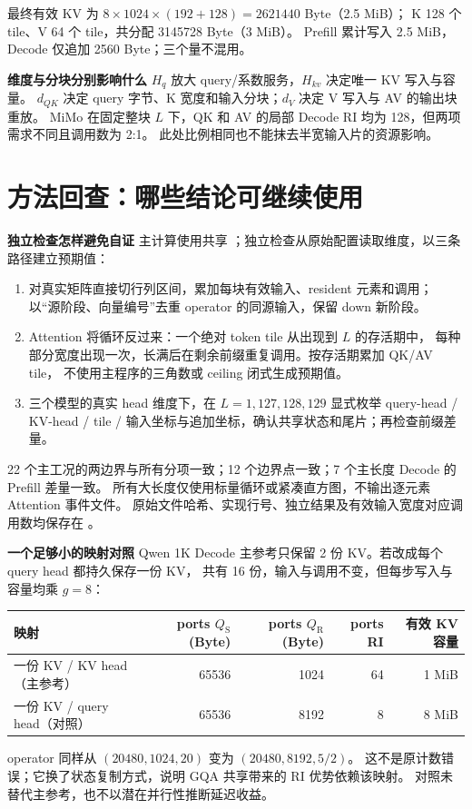 \documentclass[11pt,a4paper,fontset=fandol]{ctexart}
\newcommand{\qs}{Q_{\mathrm S}}
\newcommand{\qr}{Q_{\mathrm R}}
\newcommand{\para}[1]{\par\smallskip\noindent\textbf{#1}\quad}
\begin{document}
最终有效 KV 为 $8\times1024\times(192+128)=2621440$ Byte（2.5 MiB）；
K 128 个 tile、V 64 个 tile，共分配 3145728 Byte（3 MiB）。
Prefill 累计写入 2.5 MiB，Decode 仅追加 2560 Byte；三个量不混用。

\para{维度与分块分别影响什么}
$H_q$ 放大 query/系数服务，$H_{kv}$ 决定唯一 KV 写入与容量。
$d_{QK}$ 决定 query 字节、K 宽度和输入分块；$d_V$ 决定 V 写入与 AV 的输出块重放。
MiMo 在固定整块 $L$ 下，QK 和 AV 的局部 Decode RI 均为 128，但两项需求不同且调用数为 2:1。
此处比例相同也不能抹去半宽输入片的资源影响。

\clearpage
\section{方法回查：哪些结论可继续使用}
\para{独立检查怎样避免自证}
主计算使用共享 ；独立检查从原始配置读取维度，以三条路径建立预期值：
\begin{enumerate}
\item 对真实矩阵直接切行列区间，累加每块有效输入、resident 元素和调用；
以“源阶段、向量编号”去重 operator 的同源输入，保留 down 新阶段。
\item Attention 将循环反过来：一个绝对 token tile 从出现到 $L$ 的存活期中，
每种部分宽度出现一次，长满后在剩余前缀重复调用。按存活期累加 QK/AV tile，
不使用主程序的三角数或 ceiling 闭式生成预期值。
\item 三个模型的真实 head 维度下，在 $L=1,127,128,129$ 显式枚举
query-head / KV-head / tile / 输入坐标与追加坐标，确认共享状态和尾片；再检查前缀差量。
\end{enumerate}
22 个主工况的两边界与所有分项一致；12 个边界点一致；7 个主长度 Decode 的 Prefill 差量一致。
所有大长度仅使用标量循环或紧凑直方图，不输出逐元素 Attention 事件文件。
原始文件哈希、实现行号、独立结果及有效输入宽度对应调用数均保存在 。

\para{一个足够小的映射对照}
Qwen 1K Decode 主参考只保留 2 份 KV。若改成每个 query head 都持久保存一份 KV，
共有 16 份，输入与调用不变，但每步写入与容量均乘 $g=8$：
\begin{center}\small
\begin{tabular}{@{}lrrrr@{}}\toprule
映射 & ports $\qs$ (Byte) & ports $\qr$ (Byte) & ports RI & 有效 KV 容量\\\midrule
一份 KV / KV head（主参考） & 65536 & 1024 & 64 & 1 MiB\\
一份 KV / query head（对照） & 65536 & 8192 & 8 & 8 MiB\\\bottomrule
\end{tabular}\end{center}
operator 同样从 $(20480,1024,20)$ 变为 $(20480,8192,5/2)$。
这不是原计数错误；它换了状态复制方式，说明 GQA 共享带来的 RI 优势依赖该映射。
对照未替代主参考，也不以潜在并行性推断延迟收益。
\end{document}
